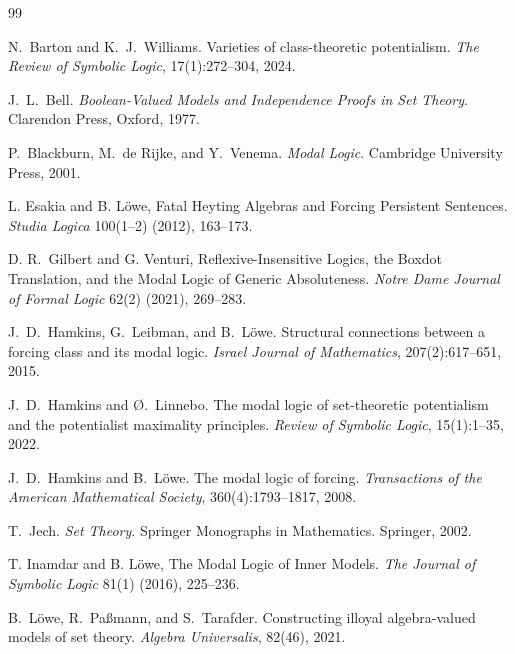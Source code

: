 \documentclass[11pt]{amsart}
\theoremstyle{definition}
\theoremstyle{plain}
\begin{document}
\begin{thebibliography}{99}

N.~Barton and K.~J.~Williams.
\newblock Varieties of class-theoretic potentialism.
\newblock \emph{The Review of Symbolic Logic}, 17(1):272--304, 2024.

J.~L.~Bell.
\newblock \emph{Boolean-Valued Models and Independence Proofs in Set Theory}.
\newblock Clarendon Press, Oxford, 1977.

P.~Blackburn, M.~de Rijke, and Y.~Venema.
\newblock \emph{Modal Logic}.
\newblock Cambridge University Press, 2001.

L. Esakia and B. Löwe,
\newblock Fatal Heyting Algebras and Forcing Persistent Sentences.
\newblock \emph{Studia Logica} 100(1--2) (2012), 163--173.

D. R.\ Gilbert and G. Venturi,
\newblock Reflexive-Insensitive Logics, the Boxdot Translation, and the Modal Logic of Generic Absoluteness.
\newblock \emph{Notre Dame Journal of Formal Logic} 62(2) (2021), 269--283.

J.~D.~Hamkins, G.~Leibman, and B.~L\"owe.
\newblock Structural connections between a forcing class and its modal logic.
\newblock \emph{Israel Journal of Mathematics}, 207(2):617--651, 2015.

J.~D.~Hamkins and \O.~Linnebo.
\newblock The modal logic of set-theoretic potentialism and the potentialist maximality principles.
\newblock \emph{Review of Symbolic Logic}, 15(1):1--35, 2022.

J.~D.~Hamkins and B.~L\"owe.
\newblock The modal logic of forcing.
\newblock \emph{Transactions of the American Mathematical Society}, 360(4):1793--1817, 2008.

T.~Jech.
\newblock \emph{Set Theory}.
\newblock Springer Monographs in Mathematics. Springer, 2002.

T. Inamdar and B. Löwe,
\newblock The Modal Logic of Inner Models.
\newblock \emph{The Journal of Symbolic Logic} 81(1) (2016), 225--236.

B.~L\"owe, R.~Pa{\ss}mann, and S.~Tarafder.
\newblock Constructing illoyal algebra-valued models of set theory.
\newblock \emph{Algebra Universalis}, 82(46), 2021.

\end{thebibliography}
\end{document}
